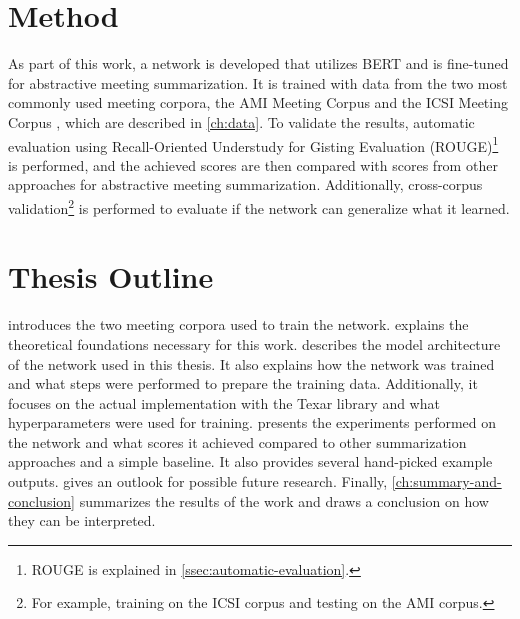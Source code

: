 
\section{Method}

As part of this work, a network is developed that utilizes BERT and is fine-tuned for abstractive meeting summarization.
It is trained with data from the two most commonly used meeting corpora, the AMI Meeting Corpus \cite{Mccowan05theami} and the ICSI Meeting Corpus \cite{Janin}, which are described in \cref{ch:data}.
To validate the results, automatic evaluation using Recall-Oriented Understudy for Gisting Evaluation (ROUGE)\footnote{ROUGE is explained in \cref{ssec:automatic-evaluation}.} is performed, and the achieved scores are then compared with scores from other approaches for abstractive meeting summarization.
Additionally, cross-corpus validation\footnote{For example, training on the ICSI corpus and testing on the AMI corpus.} is performed to evaluate if the network can generalize what it learned.


\section{Thesis Outline}

 introduces the two meeting corpora used to train the network.
 explains the theoretical foundations necessary for this work.
 describes the model architecture of the network used in this thesis.
It also explains how the network was trained and what steps were performed to prepare the training data.
Additionally, it focuses on the actual implementation with the Texar library \cite{hu2019texar} and what hyperparameters were used for training.
 presents the experiments performed on the network and what scores it achieved compared to other summarization approaches and a simple baseline.
It also provides several hand-picked example outputs.
 gives an outlook for possible future research.
Finally, \cref{ch:summary-and-conclusion} summarizes the results of the work and draws a conclusion on how they can be interpreted.
